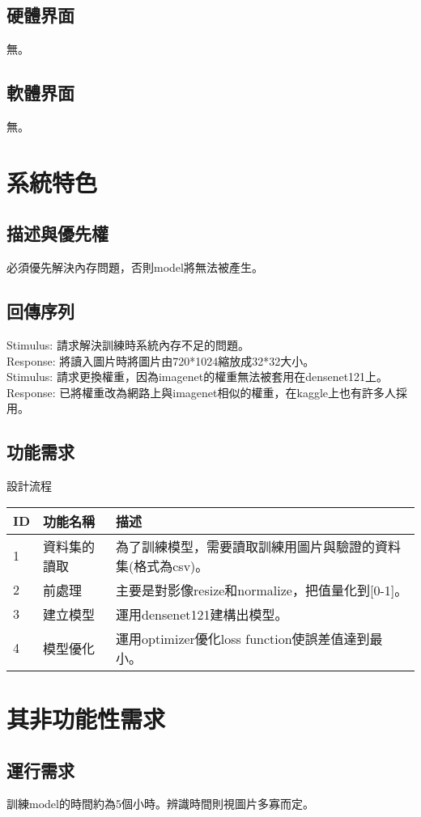 \documentclass{scrreprt}
\begin{document}
\section{硬體界面}
無。
\section{軟體界面}
無。
\chapter{系統特色}
\section{描述與優先權}
必須優先解決內存問題，否則model將無法被產生。
\section{回傳序列}
Stimulus: 請求解決訓練時系統內存不足的問題。 \\
Response: 將讀入圖片時將圖片由720*1024縮放成32*32大小。 \\ 
Stimulus: 請求更換權重，因為imagenet的權重無法被套用在densenet121上。 \\
Response: 已將權重改為網路上與imagenet相似的權重，在kaggle上也有許多人採用。 \\
\section{功能需求}
設計流程
\begin{center}
	\begin{tabular}[t]{|l|l|p{10cm}|}
		\hline
		ID & 功能名稱 & 描述 \\
		\hline
		1 & 資料集的讀取 & 為了訓練模型，需要讀取訓練用圖片與驗證的資料集(格式為csv)。 \\
		\hline
		2 & 前處理 & 主要是對影像resize和normalize，把值量化到[0-1]。 \\
		\hline
		3 & 建立模型 & 運用densenet121建構出模型。 \\
		\hline
		4 & 模型優化 & 運用optimizer優化loss function使誤差值達到最小。 \\
		\hline
	\end{tabular}
\end{center}
\chapter{其非功能性需求}
\section{運行需求}
訓練model的時間約為5個小時。辨識時間則視圖片多寡而定。

\end{document}
